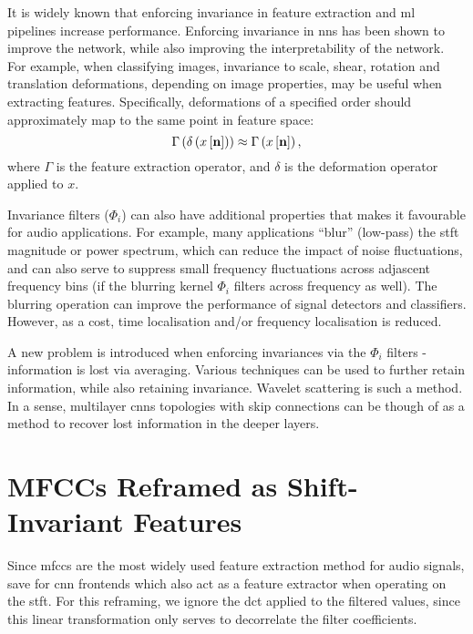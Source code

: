 It is widely known that enforcing invariance in feature extraction and \ac{ml} pipelines increase performance. Enforcing invariance in \acp{nn} has been shown to improve the network, while also improving the interpretability of the network. For example, when classifying images, invariance to scale, shear, rotation and translation deformations, depending on image properties, may be useful when extracting features. Specifically, deformations of a specified order should approximately map to the same point in feature space:
\begin{equation}
    \Gamma\left(\delta\left(x\left[\boldsymbol{\mathbf{n}}\right]\right)\right) \approx \Gamma\left(x\left[\boldsymbol{\mathbf{n}}\right]\right),
\end{equation}
where $\Gamma$ is the feature extraction operator, and $\delta$ is the deformation operator applied to $x$.

Invariance filters ($\Phi_i$) can also have additional properties that makes it favourable for audio applications. For example, many applications ``blur'' (low-pass) the \ac{stft} magnitude or power spectrum, which can reduce the impact of noise fluctuations, and can also serve to suppress small frequency fluctuations across adjascent frequency bins (if the blurring kernel $\Phi_i$ filters across frequency as well). The blurring operation can improve the performance of signal detectors and classifiers. However, as a cost, time localisation and/or frequency localisation is reduced.

A new problem is introduced when enforcing invariances via the $\Phi_i$ filters - information is lost via averaging. Various techniques can be used to further retain information, while also retaining invariance. Wavelet scattering is such a method. In a sense, multilayer \acp{cnn} topologies with skip connections can be though of as a method to recover lost information in the deeper layers.

\section{MFCCs Reframed as Shift-Invariant Features}

Since \acp{mfcc} are the most widely used feature extraction method for audio signals, save for \ac{cnn} frontends which also act as a feature extractor when operating on the \ac{stft}. For this reframing, we ignore the \ac{dct} applied to the filtered values, since this linear transformation only serves to decorrelate the filter coefficients.

